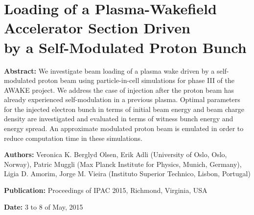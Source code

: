 %
%

\chapter[Loading of a Plasma-Wakefield Accelerator Section Driven by a Self-Modulated\\Proton Bunch,
         \emph{Proceedings of IPAC 2015}]%
        {Loading of a Plasma-Wakefield Accelerator Section Driven\\by a Self-Modulated Proton Bunch}
\label{Pub:IPAC15}

\begin{hangparas}{10mm}{1}

    \textbf{Abstract:}
    We investigate beam loading of a plasma wake driven by a self-modulated proton beam using particle-in-cell
    simulations for phase III of the AWAKE project. We address the case of injection after the proton beam has already
    experienced self-modulation in a previous plasma. Optimal parameters for the injected electron bunch in terms of
    initial beam energy and beam charge density are investigated and evaluated in terms of witness bunch energy and
    energy spread. An approximate modulated proton beam is emulated in order to reduce computation time in these
    simulations.

    \vspace{8mm}

    \textbf{Authors:}
    Veronica K. Berglyd Olsen, Erik Adli (University of Oslo, Oslo, Norway),
    Patric Muggli (Max Planck Institute for Physics, Munich, Germany),
    Ligia D. Amorim, Jorge M. Vieira (Instituto Superior Technico, Lisbon, Portugal)

    \vspace{5mm}

    \textbf{Publication:}
    Proceedings of IPAC 2015, Richmond, Virginia, USA  \cite{berglyd_olsen:2015}

    \vspace{5mm}

    \textbf{Date:} 3 to 8 of May, 2015

\end{hangparas}
